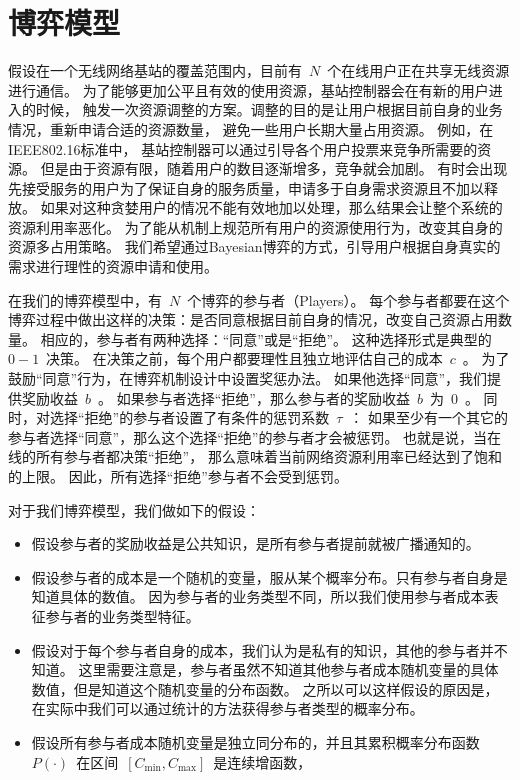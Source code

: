 \section{博弈模型}
假设在一个无线网络基站的覆盖范围内，目前有~$N$~个在线用户正在共享无线资源进行通信。
为了能够更加公平且有效的使用资源，基站控制器会在有新的用户进入的时候，
触发一次资源调整的方案。调整的目的是让用户根据目前自身的业务情况，重新申请合适的资源数量，
避免一些用户长期大量占用资源。
例如，在IEEE802.16标准中，
基站控制器可以通过引导各个用户投票来竞争所需要的资源。
但是由于资源有限，随着用户的数目逐渐增多，竞争就会加剧。
有时会出现先接受服务的用户为了保证自身的服务质量，申请多于自身需求资源且不加以释放。
如果对这种贪婪用户的情况不能有效地加以处理，那么结果会让整个系统的资源利用率恶化。
为了能从机制上规范所有用户的资源使用行为，改变其自身的资源多占用策略。
我们希望通过Bayesian博弈的方式，引导用户根据自身真实的需求进行理性的资源申请和使用。

在我们的博弈模型中，有~$N$~个博弈的参与者（Players）。
每个参与者都要在这个博弈过程中做出这样的决策：是否同意根据目前自身的情况，改变自己资源占用数量。
相应的，参与者有两种选择：“同意”或是“拒绝”。
这种选择形式是典型的~$0-1$~决策。
在决策之前，每个用户都要理性且独立地评估自己的成本~$c$~。
为了鼓励“同意”行为，在博弈机制设计中设置奖惩办法。
如果他选择“同意”，我们提供奖励收益~$b$~。
如果参与者选择“拒绝”，那么参与者的奖励收益~$b$~为~$0$~。
同时，对选择“拒绝”的参与者设置了有条件的惩罚系数~$\tau$~：
如果至少有一个其它的参与者选择“同意”，那么这个选择“拒绝”的参与者才会被惩罚。
也就是说，当在线的所有参与者都决策“拒绝”，
那么意味着当前网络资源利用率已经达到了饱和的上限。
因此，所有选择“拒绝”参与者不会受到惩罚。

对于我们博弈模型，我们做如下的假设：
\begin{itemize}
    \item 假设参与者的奖励收益是公共知识，是所有参与者提前就被广播通知的。
    \item 假设参与者的成本是一个随机的变量，服从某个概率分布。只有参与者自身是知道具体的数值。
    因为参与者的业务类型不同，所以我们使用参与者成本表征参与者的业务类型特征。
    \item 假设对于每个参与者自身的成本，我们认为是私有的知识，其他的参与者并不知道。
    这里需要注意是，参与者虽然不知道其他参与者成本随机变量的具体数值，但是知道这个随机变量的分布函数。
    之所以可以这样假设的原因是，在实际中我们可以通过统计的方法获得参与者类型的概率分布。
    \item 假设所有参与者成本随机变量是独立同分布的，并且其累积概率分布函数~$P(\cdot)$~在区间~$[C_{\min}, C_{\max}]$~是连续增函数，
\end{itemize}

